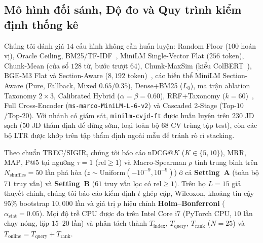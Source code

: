 \subsection{Mô hình đối sánh, Độ đo và Quy trình kiểm định thống kê}
Chúng tôi đánh giá $14$ cấu hình không cần huấn luyện: Random Floor ($100$ hoán vị), Oracle Ceiling, BM25/TF-IDF~\cite{robertson2009probabilistic}, MiniLM Single-Vector Flat ($256$ token), Chunk-Mean (cửa sổ $128$ từ, bước trượt $64$), Chunk-MaxSim (kiểu ColBERT~\cite{khattab2020colbert}), BGE-M3 Flat và Section-Aware ($8{,}192$ token)~\cite{chen2024bge}, các biến thể MiniLM Section-Aware (Pure, Fallback, Mixed $0.65/0.35$), Dense+BM25 ($L_0$), ma trận ablation Taxonomy $2\times 3$, Calibrated Hybrid ($\alpha=\beta=0.60$), RRF+Taxonomy ($k=60$)~\cite{cormack2009reciprocal}, Full Cross-Encoder (\texttt{ms-marco-MiniLM-L-6-v2}) và Cascaded 2-Stage (Top-$10$/Top-$20$). Với nhánh có giám sát, \texttt{minilm-cvjd-ft} được huấn luyện trên $230$ JD sạch ($50$ JD thẩm định để dừng sớm, loại toàn bộ $68$ CV trùng tập test), còn các bộ LTR được khớp trên tập thẩm định ngoài mẫu để tránh rò rỉ stacking.

Theo chuẩn TREC/SIGIR, chúng tôi báo cáo $\text{nDCG}@K$ ($K\in\{5,10\}$), $\text{MRR}$, $\text{MAP}$, $\text{P}@5$ tại ngưỡng $\tau=1$ ($\text{rel}\ge 1$) và Macro-Spearman $\rho$ tính trung bình trên $N_{\text{shuffles}}=50$ lần phá hòa ($z\sim\text{Uniform}(-10^{-9},10^{-9})$) ở cả \textbf{Setting~A} (toàn bộ $71$ truy vấn) và \textbf{Setting~B} ($61$ truy vấn lọc có $\text{rel}\ge 1$). Trên họ $L=15$ giả thuyết chính, chúng tôi báo cáo kiểm định $t$ ghép cặp, Wilcoxon, khoảng tin cậy $95\%$ bootstrap $10{,}000$ lần và giá trị $p$ hiệu chỉnh \textbf{Holm--Bonferroni} ($\alpha_{\text{stat}}=0.05$). Mọi độ trễ CPU được đo trên Intel Core i7 (PyTorch CPU, $10$ lần chạy nóng, lặp $15$--$20$ lần) và phân tách thành $T_{\text{index}}$, $T_{\text{query}}$, $T_{\text{rank}}$ ($N=25$) và $T_{\text{online}} = T_{\text{query}} + T_{\text{rank}}$.
